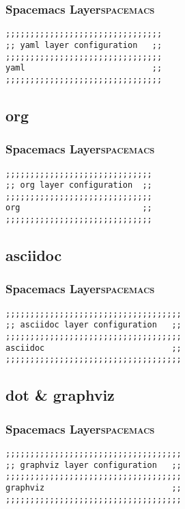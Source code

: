 \documentclass[11pt]{article}
\begin{document}
\subsubsection{Spacemacs Layer\hfill{}\textsc{spacemacs}}
\label{sec:org8726e32}
\begin{verbatim}
;;;;;;;;;;;;;;;;;;;;;;;;;;;;;;;;
;; yaml layer configuration   ;;
;;;;;;;;;;;;;;;;;;;;;;;;;;;;;;;;
yaml                          ;;
;;;;;;;;;;;;;;;;;;;;;;;;;;;;;;;;
\end{verbatim}

\subsection{org}
\label{sec:orgfd2fa9b}
\subsubsection{Spacemacs Layer\hfill{}\textsc{spacemacs}}
\label{sec:orgab0a854}
\begin{verbatim}
;;;;;;;;;;;;;;;;;;;;;;;;;;;;;;
;; org layer configuration  ;;
;;;;;;;;;;;;;;;;;;;;;;;;;;;;;;
org                         ;;
;;;;;;;;;;;;;;;;;;;;;;;;;;;;;;
\end{verbatim}

\subsection{asciidoc}
\label{sec:org371126b}
\subsubsection{Spacemacs Layer\hfill{}\textsc{spacemacs}}
\label{sec:org47ab6e0}
\begin{verbatim}
;;;;;;;;;;;;;;;;;;;;;;;;;;;;;;;;;;;;
;; asciidoc layer configuration   ;;
;;;;;;;;;;;;;;;;;;;;;;;;;;;;;;;;;;;;
asciidoc                          ;;
;;;;;;;;;;;;;;;;;;;;;;;;;;;;;;;;;;;;
\end{verbatim}

\subsection{dot \& graphviz}
\label{sec:orgf79324c}
\subsubsection{Spacemacs Layer\hfill{}\textsc{spacemacs}}
\label{sec:org0bb83fd}
\begin{verbatim}
;;;;;;;;;;;;;;;;;;;;;;;;;;;;;;;;;;;;
;; graphviz layer configuration   ;;
;;;;;;;;;;;;;;;;;;;;;;;;;;;;;;;;;;;;
graphviz                          ;;
;;;;;;;;;;;;;;;;;;;;;;;;;;;;;;;;;;;;
\end{verbatim}
\end{document}
